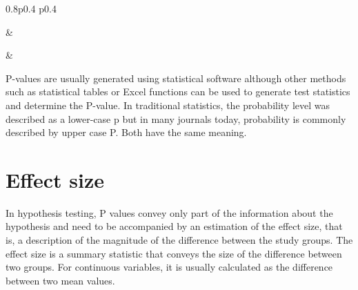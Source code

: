 \documentclass[
]{memoir}
\begin{document}
\begin{table}[ht]
\begin{centerbox}
\begin{threeparttable}
\begin{tabularx}{0.8\textwidth}{p{} p{}}
\hhline{}

 &
 \tabularnewline[-0.5pt]


\hhline{}

 &
 \tabularnewline[-0.5pt]


\end{tabularx}
\end{threeparttable}\par\end{centerbox}

\end{table}
 

P-values are usually generated using statistical software although other methods such as statistical tables or Excel functions can be used to generate test statistics and determine the P-value. In traditional statistics, the probability level was described as a lower-case p but in many journals today, probability is commonly described by upper case P. Both have the same meaning.

\hypertarget{effect-size}{%
\section{Effect size}\label{effect-size}}

In hypothesis testing, P values convey only part of the information about the hypothesis and need to be accompanied by an estimation of the effect size, that is, a description of the magnitude of the difference between the study groups. The effect size is a summary statistic that conveys the size of the difference between two groups. For continuous variables, it is usually calculated as the difference between two mean values.
\end{document}
